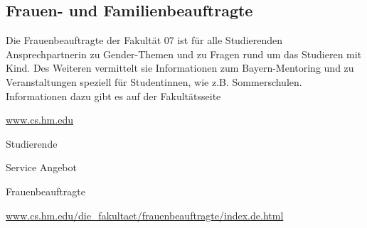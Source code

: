 \subsection{Frauen- und Familienbeauftragte}
Die Frauenbeauftragte der Fakultät 07 ist für alle Studierenden 
Ansprechpartnerin zu Gender-Themen und zu Fragen rund um das 
Studieren mit Kind. Des Weiteren vermittelt sie Informationen zum 
Bayern-Mentoring und zu Veranstaltungen speziell für Studentinnen, 
wie z.B. Sommerschulen. Informationen dazu gibt es auf der 
Fakultätsseite\doublebreak
\begin{sitenav}
	\item \url{www.cs.hm.edu}
	\item Studierende
	\item Service Angebot
	\item Frauenbeauftragte
\end{sitenav}\doublebreak
\url{www.cs.hm.edu/die_fakultaet/frauenbeauftragte/index.de.html}